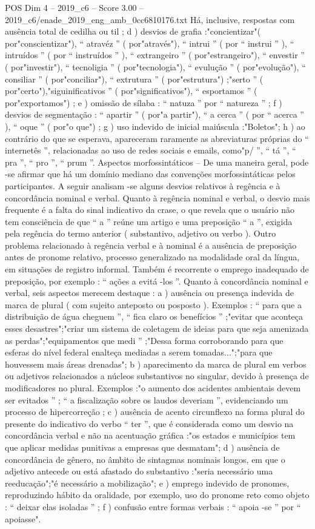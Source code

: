\begin{textsample}{POS Dim 4 – 2019\_c6 – Score 3.00 – 2019\_c6/enade\_2019\_eng\_amb\_0cc6810176.txt}
Há, inclusive, respostas com ausência total de cedilha ou til ; d ) desvios de grafia :"concientizar"( por"conscientizar"), “ atravéz ” ( por"através"), “ intrui ” ( por “ instrui ” ), “ intruídos ” ( por “ instruídos ” ), “ extrangeiro ” ( por"estrangeiro"), “ envestir ” ( por"investir"), “ tecnoligia ” ( por"tecnologia"), “ evulução ” ( por"evolução"), “ consiliar ” ( por"conciliar"), “ extrutura ” ( por"estrutura") ;"serto ” ( por"certo"),"siguinificativos ” ( por"significativos"), “ esportamos ” ( por"exportamos") ; e ) omissão de sílaba : “ natuza ” por “ natureza ” ; f ) desvios de segmentação : “ apartir ” ( por"a partir"), “ a cerca ” ( por “ acerca ” ), “ oque ” ( por"o que") ; g ) uso indevido de inicial maiúscula :"Boletos"; h ) ao contrário do que se esperava, apareceram raramente as abreviaturas próprias do “ internetês ”, relacionadas ao uso de redes sociais e emails, como"p/ ”, “ tá ”, “ pra ”, “ pro ”, “ prum ”.
Aspectos morfossintáticos – De uma maneira geral, pode -se afirmar que há um domínio mediano das convenções morfossintáticas pelos participantes.
A seguir analisam -se alguns desvios relativos à regência e à concordância nominal e verbal.
Quanto à regência nominal e verbal, o desvio mais frequente é a falta do sinal indicativo da crase, o que revela que o usuário não tem consciência de que “ a ” reúne um artigo e uma preposição “ a ”, exigida pela regência do termo anterior ( substantivo, adjetivo ou verbo ).
Outro problema relacionado à regência verbal e à nominal é a ausência de preposição antes de pronome relativo, processo generalizado na modalidade oral da língua, em situações de registro informal.
Também é recorrente o emprego inadequado de preposição, por exemplo : “ ações a evitá -los ”.
Quanto à concordância nominal e verbal, seis aspectos merecem destaque : a ) ausência ou presença indevida de marca de plural ( com sujeito anteposto ou posposto ).
Exemplos : “ para que a distribuição de água cheguem ”, “ fica claro os benefícios ” ;"evitar que aconteça esses desastres";"criar um sistema de coletagem de ideias para que seja amenizada as perdas";"equipamentos que medi ” ;"Dessa forma corroborando para que esferas do nível federal enalteça mediadas a serem tomadas...";"para que houvessem mais áreas drenadas"; b ) aparecimento da marca de plural em verbos ou adjetivos relacionados a núcleos substantivos no singular, devido à presença de modificadores no plural.
Exemplos :"o aumento dos acidentes ambientais devem ser evitados ” ; “ a fiscalização sobre os laudos deveriam ”, evidenciando um processo de hipercorreção ; c ) ausência de acento circunflexo na forma plural do presente do indicativo do verbo “ ter ”, que é considerada como um desvio na concordância verbal e não na acentuação gráfica :"os estados e municípios tem que aplicar medidas punitivas a empresas que desmatam"; d ) ausência de concordância de gênero, no âmbito de sintagmas nominais longos, em que o adjetivo antecede ou está afastado do substantivo :"seria necessário uma reeducação";"é necessário a mobilização"; e ) emprego indevido de pronomes, reproduzindo hábito da oralidade, por exemplo, uso do pronome reto como objeto : “ deixar elas isoladas ” ; f ) confusão entre formas verbais : “ apoia -se ” por “ apoiasse".

\end{textsample}
